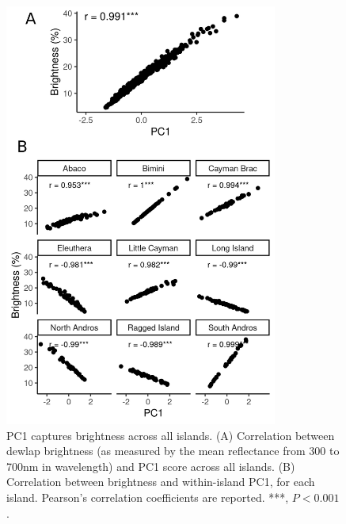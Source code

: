 \pagebreak

\begin{figure}[H]
	\centering
	\includegraphics[width=0.8\textwidth]{figures/brightness.png}
	\caption{PC1 captures brightness across all islands. (A) Correlation between dewlap brightness (as measured by the mean reflectance from 300 to 700nm in wavelength) and PC1 score across all islands. (B) Correlation between brightness and within-island PC1, for each island. Pearson's correlation coefficients are reported. ***, $P < 0.001$.}
	\label{fig:brightness}
\end{figure}
